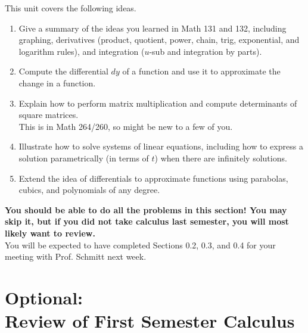 This unit covers the following ideas. \begin{enumerate}
\item Give a summary of the ideas you learned in Math 131 and 132, including graphing, derivatives (product, quotient, power, chain, trig, exponential, and logarithm rules), and integration ($u$-sub and integration by parts).
\item Compute the differential $dy$ of a function and use it to approximate the change in a function. 
\item Explain how to perform matrix multiplication and compute determinants of square matrices. \\
This is in Math 264/260, so might be new to a few of you.
\item Illustrate how to solve systems of linear equations, including how to express a solution parametrically (in terms of $t$) when there are infinitely solutions.
\item Extend the idea of differentials to approximate functions using parabolas, cubics, and polynomials of any degree.
\end{enumerate}

%

\newpage

\large \textbf{ You should be able to do all the problems in this section! You may skip it, but if you did not take calculus last semester, you will most likely want to review.}\\

You will be expected to have completed Sections 0.2, 0.3, and 0.4 for your meeting with Prof. Schmitt next week.\\

\normalsize

\section[Optional: Review of First Semester Calculus]{Optional:\\ Review of First Semester Calculus}
